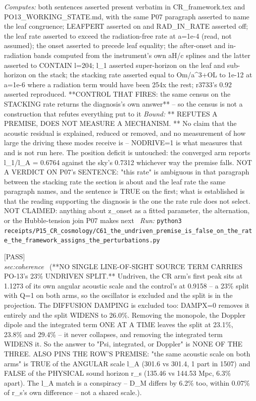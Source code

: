 \begin{description}
\emph{Computes:} both sentences asserted present verbatim in CR\_framework.tex and PO13\_WORKING\_STATE.md, with the same P07 paragraph asserted to name the leaf congruence; LEAFPERT asserted on and RAD\_IN\_RATE asserted off; the leaf rate asserted to exceed the radiation-free rate at a=1e-4 (read, not assumed); the onset asserted to precede leaf equality; the after-onset and in-radiation bands computed from the instrument's own aH/c splines and the latter asserted to CONTAIN l=204; l\_1 asserted super-horizon on the leaf and sub-horizon on the stack; the stacking rate asserted equal to Om/a\textasciicircum{}3+OL to 1e-12 at a=1e-6 where a radiation term would have been 254x the rest; r3733's 0.92 asserted reproduced. **CONTROL THAT FIRES: the same census on the STACKING rate returns the diagnosis's own answer** -- so the census is not a construction that refutes everything put to it
 \emph{Bound:} ** REFUTES A PREMISE, DOES NOT MEASURE A MECHANISM. ** No claim that the acoustic residual is explained, reduced or removed, and no measurement of how large the driving these modes receive is -- NODRIVE=1 is what measures that and is not run here. The position deficit is untouched: the converged arm reports l\_1/l\_A = 0.6764 against the sky's 0.7312 whichever way the premise falls. NOT A VERDICT ON P07's SENTENCE: "this rate" is ambiguous in that paragraph between the stacking rate the section is about and the leaf rate the same paragraph names, and the sentence is TRUE on the first; what is established is that the reading supporting the diagnosis is the one the rate rule does not select. NOT CLAIMED: anything about z\_onset as a fitted parameter, the alternation, or the Hubble-tension join P07 makes next
\ \emph{Run:} \texttt{python3 receipts/P15\_CR\_cosmology/C61\_the\_undriven\_premise\_is\_false\_on\_the\_rate\_the\_framework\_assigns\_the\_perturbations.py}
\item[\label{rcpt:C63_no_single_source_term_carries_the_undriven_split_and_the_first_probe_read_an_unwired_knob}\texttt{C63\_no\_single\_source\_term\_carries\_the\_undriven\_split\_and\_the\_first\_probe\_read\_an\_unwired\_knob}]\hfill\textsf{[PASS]}\\
\textit{sec:coherence} \ (**NO SINGLE LINE-OF-SIGHT SOURCE TERM CARRIES PO-13's 23\% UNDRIVEN SPLIT.** Undriven, the CR arm's first peak sits at 1.1273 of its own angular acoustic scale and the control's at 0.9158 -- a 23\% split with Q=1 on both arms, so the oscillator is excluded and the split is in the projection. The DIFFUSION DAMPING is excluded too: DAMPX=0 removes it entirely and the split WIDENS to 26.0\%. Removing the monopole, the Doppler dipole and the integrated term ONE AT A TIME leaves the split at 23.1\%, 23.8\% and 29.4\% -- it never collapses, and removing the integrated term WIDENS it. So the answer to "Psi, integrated, or Doppler" is NONE OF THE THREE. ALSO PINS THE ROW'S PREMISE: "the same acoustic scale on both arms" is TRUE of the ANGULAR scale l\_A (301.6 vs 301.4, 1 part in 1507) and FALSE of the PHYSICAL sound horizon r\_s (135.46 vs 144.53 Mpc, 6.3\% apart). The l\_A match is a conspiracy -- D\_M differs by 6.2\% too, within 0.07\% of r\_s's own difference -- not a shared scale.). 

\end{description}
